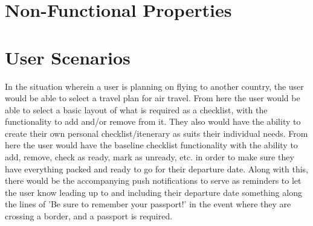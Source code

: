 \documentclass[12pt]{article}
\begin{document}
\section*{Non-Functional Properties}

\section*{User Scenarios}

	In the situation wherein a user is planning on flying to another country, the user would be able to select a travel plan for air travel.
	From here the user would be able to select a basic layout of what is required as a checklist, with the functionality to add and/or remove from it.
	They also would have the ability to create their own personal checklist/itenerary as suits their individual needs.
	From here the user would have the baseline checklist functionality with the ability to add, remove, check as ready, mark as unready, etc. in order to make sure they have everything packed and ready to go for their departure date.
	Along with this, there would be the accompanying push notifications to serve as reminders to let the user know leading up to and including their departure date something along the lines of 'Be sure to remember your passport!' in the event where they are crossing a border, and a passport is required.
\end{document}
